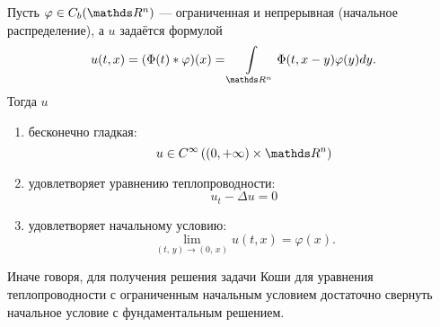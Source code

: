 \begin{theorem}
Пусть $\varphi\in C_b(\real^n)$ --- ограниченная и непрерывная (начальное распределение), а $u$ задаётся формулой
$$u(t,x) = (\Phi(t) * \varphi) (x) =  \int\limits_{\real^n}\Phi(t, x-y)\varphi(y)dy.$$
Тогда $u$
\begin{enumerate}
\item бесконечно гладкая: $$u \in C^\infty\left(\left(0, +\infty\right)\times \real^n\right)$$
\item удовлетворяет уравнению теплопроводности: $$ u_t - \Delta u = 0$$
\item удовлетворяет начальному условию: $$\lim\limits_{(t,\,y) \rightarrow (0,\,x)}u(t,x) = \varphi (x).$$
\end{enumerate}

Иначе говоря, для получения решения задачи Коши для уравнения теплопроводности с ограниченным начальным условием достаточно свернуть начальное условие с фундаментальным решением.
\end{theorem}

